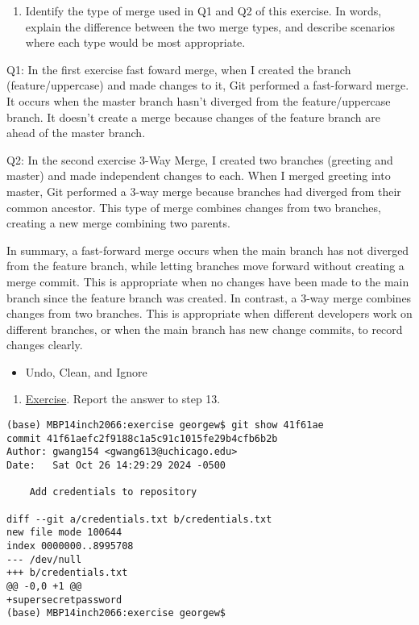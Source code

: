 \documentclass[
  letterpaper,
  DIV=11,
  numbers=noendperiod]{scrartcl}
\providecommand{\tightlist}{%
  \setlength{\itemsep}{0pt}\setlength{\parskip}{0pt}}\usepackage{longtable,booktabs,array}
\begin{document}
\begin{enumerate}
\def\labelenumi{\arabic{enumi}.}
\setcounter{enumi}{2}
\tightlist
\item
  Identify the type of merge used in Q1 and Q2 of this exercise. In
  words, explain the difference between the two merge types, and
  describe scenarios where each type would be most appropriate.
\end{enumerate}

Q1: In the first exercise fast foward merge, when I created the branch
(feature/uppercase) and made changes to it, Git performed a fast-forward
merge. It occurs when the master branch hasn't diverged from the
feature/uppercase branch. It doesn't create a merge because changes of
the feature branch are ahead of the master branch.

Q2: In the second exercise 3-Way Merge, I created two branches (greeting
and master) and made independent changes to each. When I merged greeting
into master, Git performed a 3-way merge because branches had diverged
from their common ancestor. This type of merge combines changes from two
branches, creating a new merge combining two parents.

In summary, a fast-forward merge occurs when the main branch has not
diverged from the feature branch, while letting branches move forward
without creating a merge commit. This is appropriate when no changes
have been made to the main branch since the feature branch was created.
In contrast, a 3-way merge combines changes from two branches. This is
appropriate when different developers work on different branches, or
when the main branch has new change commits, to record changes clearly.

\begin{itemize}
\tightlist
\item
  Undo, Clean, and Ignore
\end{itemize}

\begin{enumerate}
\def\labelenumi{\arabic{enumi}.}
\tightlist
\item
  \href{https://github.com/eficode-academy/git-katas/blob/master/basic-revert/README.md}{Exercise}.
  Report the answer to step 13.
\end{enumerate}

\begin{verbatim}
(base) MBP14inch2066:exercise georgew$ git show 41f61ae
commit 41f61aefc2f9188c1a5c91c1015fe29b4cfb6b2b
Author: gwang154 <gwang613@uchicago.edu>
Date:   Sat Oct 26 14:29:29 2024 -0500

    Add credentials to repository

diff --git a/credentials.txt b/credentials.txt
new file mode 100644
index 0000000..8995708
--- /dev/null
+++ b/credentials.txt
@@ -0,0 +1 @@
+supersecretpassword
(base) MBP14inch2066:exercise georgew$ 
\end{verbatim}
\end{document}
